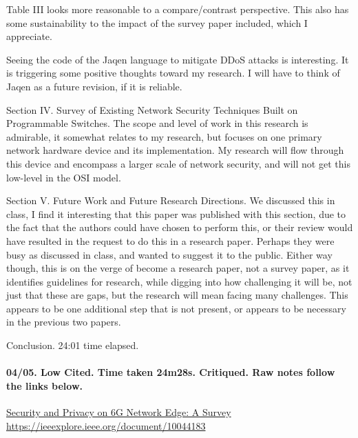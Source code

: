 \documentclass{article}
\begin{document}
{Table III looks more reasonable to a compare/contrast perspective. This also has some sustainability to the impact of the survey paper included, which I appreciate.

Seeing the code of the Jaqen language to mitigate DDoS attacks is interesting. It is triggering some positive thoughts toward my research. I will have to think of Jaqen as a future revision, if it is reliable.

Section IV. Survey of Existing Network Security Techniques Built on Programmable Switches. The scope and level of work in this research is admirable, it somewhat relates to my research, but focuses on one primary network hardware device and its implementation. My research will flow through this device and encompass a larger scale of network security, and will not get this low-level in the OSI model.

Section V. Future Work and Future Research Directions. We discussed this in class, I find it interesting that this paper was published with this section, due to the fact that the authors could have chosen to perform this, or their review would have resulted in the request to do this in a research paper. Perhaps they were busy as discussed in class, and wanted to suggest it to the public. Either way though, this is on the verge of become a research paper, not a survey paper, as it identifies guidelines for research, while digging into how challenging it will be, not just that these are gaps, but the research will mean facing many challenges. This appears to be one additional step that is not present, or appears to be necessary in the previous two papers.

Conclusion.
24:01 time elapsed.}


        \paragraph{
            \cite{mao_security_2023}04/05. Low Cited. Time taken 24m28s. Critiqued. Raw notes follow the links below.
        }
        \hfill \break
        \href{
            https://ieeexplore.ieee.org/document/10044183
        }
            {Security and Privacy on 6G Network Edge: A Survey}
            \\
        \url{https://ieeexplore.ieee.org/document/10044183}
        \\\\
\end{document}
